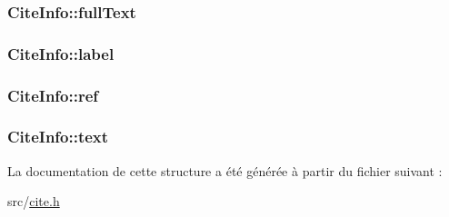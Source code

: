 \subsubsection[{full\+Text}]{ Cite\+Info\+::full\+Text}\label{struct_cite_info_a0afbc201283c71463729e97ff3e981df}
\hypertarget{struct_cite_info_a890d06cbf9082f55099c244a53319ea2}{}
\subsubsection[{label}]{ Cite\+Info\+::label}\label{struct_cite_info_a890d06cbf9082f55099c244a53319ea2}
\hypertarget{struct_cite_info_a5d290206c0dc2efaf99b253c4413aac6}{}
\subsubsection[{ref}]{ Cite\+Info\+::ref}\label{struct_cite_info_a5d290206c0dc2efaf99b253c4413aac6}
\hypertarget{struct_cite_info_a2823a2e8898a833bacf931d188e1fd19}{}
\subsubsection[{text}]{ Cite\+Info\+::text}\label{struct_cite_info_a2823a2e8898a833bacf931d188e1fd19}


La documentation de cette structure a été générée à partir du fichier suivant \+:\begin{DoxyCompactItemize}
\item 
src/\hyperlink{cite_8h}{cite.\+h}\end{DoxyCompactItemize}
